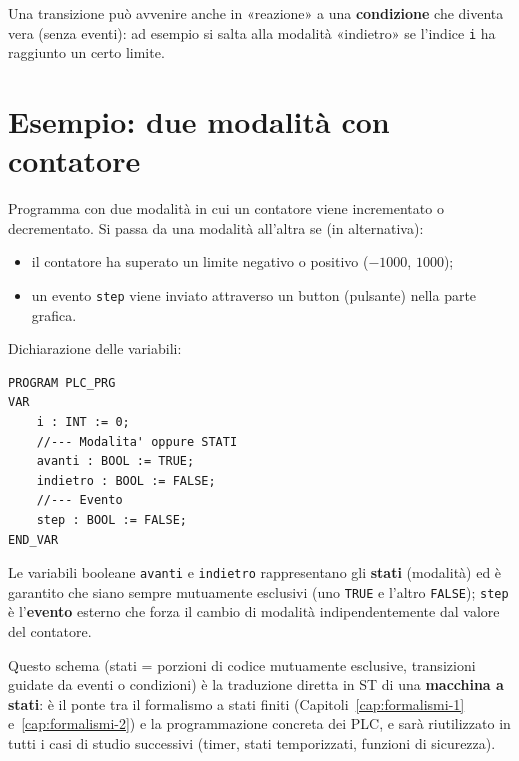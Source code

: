 Una transizione può avvenire anche in «reazione» a una \textbf{condizione} che diventa vera (senza eventi): ad esempio si salta alla modalità «indietro» se l'indice \texttt{i} ha raggiunto un certo limite.

\section{Esempio: due modalità con contatore}
Programma con due modalità in cui un contatore viene incrementato o decrementato. Si passa da una modalità all'altra se (in alternativa):
\begin{itemize}
    \item il contatore ha superato un limite negativo o positivo ($-1000$, $1000$);
    \item un evento \texttt{step} viene inviato attraverso un button (pulsante) nella parte grafica.
\end{itemize}

Dichiarazione delle variabili:
\begin{lstlisting}[basicstyle=\ttfamily\small]
PROGRAM PLC_PRG
VAR
    i : INT := 0;
    //--- Modalita' oppure STATI
    avanti : BOOL := TRUE;
    indietro : BOOL := FALSE;
    //--- Evento
    step : BOOL := FALSE;
END_VAR
\end{lstlisting}

Le variabili booleane \texttt{avanti} e \texttt{indietro} rappresentano gli \textbf{stati} (modalità) ed è garantito che siano sempre mutuamente esclusivi (uno \texttt{TRUE} e l'altro \texttt{FALSE}); \texttt{step} è l'\textbf{evento} esterno che forza il cambio di modalità indipendentemente dal valore del contatore.

\begin{intuition}
Questo schema (stati = porzioni di codice mutuamente esclusive, transizioni guidate da eventi o condizioni) è la traduzione diretta in ST di una \textbf{macchina a stati}: è il ponte tra il formalismo a stati finiti (Capitoli~\ref{cap:formalismi-1} e~\ref{cap:formalismi-2}) e la programmazione concreta dei PLC, e sarà riutilizzato in tutti i casi di studio successivi (timer, stati temporizzati, funzioni di sicurezza).
\end{intuition}
